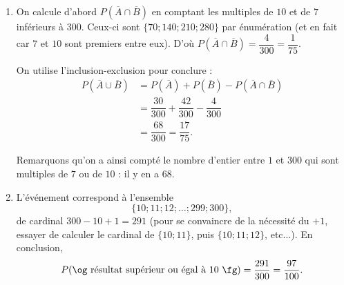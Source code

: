 {\begin{enumerate}
		D'une part, les multiples de $10$ s'écrivent
			\begin{align*}
				10 \times 1 && 10 \times 2 && 10 \times 3 && \dots && 10 \times 30 = 300,
			\end{align*}
		et donc $|\overline{A}| = 30$, et $P\left( \overline{A} \right) = \dfrac{30}{300} = \dfrac1{10}$.
		
		D'autre part, les multiples de $7$ s'écrivent
			\begin{align*}
				7 \times 1 && 7\times 2 && 7 \times 3 && \dots
			\end{align*}
		Pour savoir jusqu'où aller, on calcule $\dfrac{300}{7} \approx 42,86$, donc la liste s'arrête à $7 \times 42 = 294$.
		Par conséquent, $|\overline{B}| = 42$, et $P\left( \overline{B} \right) = \dfrac{42}{300} = \dfrac{7}{50}$.
		
		\item 
		On calcule d'abord $P\left(\overline{A} \cap \overline{B}\right)$ en comptant les multiples de $10$ et de $7$ inférieurs à $300$.
		Ceux-ci sont $\{ 70 ; 140 ; 210 ; 280 \}$ par énumération (et en fait car $7$ et $10$ sont premiers entre eux).
		D'où $P\left(\overline{A} \cap \overline{B}\right) = \dfrac{4}{300} = \dfrac{1}{75}$.
		
		On utilise l'inclusion-exclusion pour conclure :
			\begin{align*}
				P\left(\overline{A} \cup \overline{B}\right) &= P\left( \overline{A} \right) + P\left( \overline{B} \right) - P\left(\overline{A} \cap \overline{B}\right) \\
																&= \dfrac{30}{300} + \dfrac{42}{300} -  \dfrac{4}{300} \\
																&= \dfrac{68}{300} = \dfrac{17}{75}.
			\end{align*}
	
		Remarquons qu'on a ainsi compté le nombre d'entier entre $1$ et $300$ qui sont multiples de $7$ ou de $10$ : il y en a $68$.

		\item 
		L'événement correspond à l'ensemble 
			\[ \{10 ; 11 ; 12 ; \dots ; 299 ; 300 \}, \]
		de cardinal $300-10+1 = 291$ (pour se convaincre de la nécessité du $+1$, essayer de calculer le cardinal de $\{10 ; 11\}$, puis $\{10 ; 11 ; 12 \}$, etc...).
		En conclusion,
			\[ P(\text{\og résultat supérieur ou égal à $10$ \fg}) = \dfrac{291}{300} = \dfrac{97}{100}. \]
	\end{enumerate}

}


